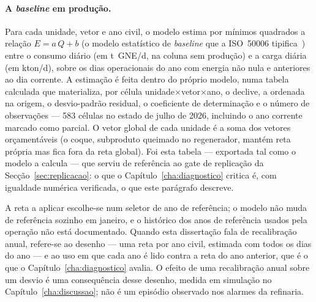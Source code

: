 \paragraph{A \emph{baseline} em produção.} Para cada unidade, vetor e ano
civil, o modelo estima por mínimos quadrados a relação
$E = a\,Q + b$ (o modelo estatístico de \emph{baseline} que a ISO~50006
tipifica~\cite{ISO50006_2014}) entre o consumo diário (em t~GNE/d, na coluna sem
produção) e a carga diária (em kton/d), sobre os dias operacionais do ano
com energia não nula e anteriores ao dia corrente. A estimação é feita
dentro do próprio modelo, numa tabela calculada que materializa, por
célula unidade$\times$vetor$\times$ano, o declive, a ordenada na origem,
o desvio-padrão residual, o coeficiente de determinação e o número de
observações --- 583 células no estado de julho de 2026, incluindo o ano
corrente marcado como parcial. O vetor global de cada unidade é a soma
dos vetores orçamentáveis (o coque, subproduto queimado no regenerador,
mantém reta própria mas fica fora da reta global). Foi esta tabela ---
exportada tal como o modelo a calcula --- que serviu de referência ao gate
de replicação da Secção~\ref{sec:replicacao}: o que o
Capítulo~\ref{cha:diagnostico} critica é, com igualdade numérica
verificada, o que este parágrafo descreve.

A reta a aplicar escolhe-se num seletor de ano de referência; o modelo não
muda de referência sozinho em janeiro, e o histórico dos anos de referência
usados pela operação não está documentado. Quando esta dissertação fala de
recalibração anual, refere-se ao desenho --- uma reta por ano civil, estimada
com todos os dias do ano --- e ao uso em que cada ano é lido contra a reta do
ano anterior, que é o que o Capítulo~\ref{cha:diagnostico} avalia. O efeito
de uma recalibração anual sobre um desvio é uma consequência desse desenho,
medida em simulação no Capítulo~\ref{cha:discussao}; não é um episódio
observado nos alarmes da refinaria.

